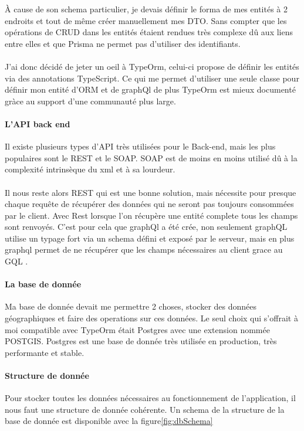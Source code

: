 À cause de son schema particulier, je devais définir le forma de mes entités à 2 endroits et tout de même créer manuellement mes DTO\@.
Sans compter que les opérations de CRUD dans les entités étaient rendues très complexe dû aux liens entre elles et que Prisma ne permet pas d'utiliser des identifiants.\\\\
J'ai donc décidé de jeter un oeil à TypeOrm, celui-ci propose de définir les entités via des annotations TypeScript.
Ce qui me permet d'utiliser une seule classe pour définir mon entité d'ORM et de graphQl de plus TypeOrm est mieux
documenté gràce au support d'une communauté plus large.

\paragraph{L'API back end}
Il existe plusieurs types d'API très utilisées pour le Back-end, mais les plus populaires sont le REST et le SOAP\@.
SOAP est de moins en moins utilisé dû à la complexité intrinsèque du xml et à sa lourdeur.\\\\
Il nous reste alors REST qui est une bonne solution, mais nécessite pour presque chaque requête de récupérer des données qui ne seront pas toujours consommées par le client.
Avec Rest lorsque l'on récupère une entité complete tous les champs sont renvoyés.
C'est pour cela que graphQl a été crée, non seulement graphQL utilise un typage fort via un schema défini et exposé par le serveur,
mais en plus graphql permet de ne récupérer que les champs nécessaires au client grace au GQL .

\paragraph{La base de donnée}
Ma base de donnée devait me permettre 2 choses, stocker des données géographiques et faire des operations sur ces données.
Le seul choix qui s'offrait à moi compatible avec TypeOrm était Postgres avec une extension nommée POSTGIS\@.
Postgres est une base de donnée très utilisée en production, très performante et stable.

\paragraph{Structure de donnée}
Pour stocker toutes les données nécessaires au fonctionnement de l'application, il nous faut une structure de donnée cohérente.
Un schema de la structure de la base de donnée est disponible avec la figure\ref{fig:dbSchema}


